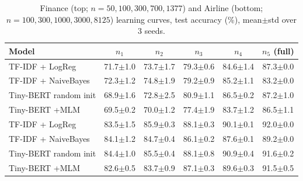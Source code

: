 \begin{table}[t]
\centering\small\setlength{\tabcolsep}{3pt}
\caption{Finance (top; $n=50,100,300,700,1377$) and Airline (bottom; $n=100,300,1000,3000,8125$) learning curves, test accuracy (\%), mean$\pm$std over 3 seeds.}\label{tab:fin_air}
\begin{tabular}{lccccc}
\toprule
Model & $n_1$ & $n_2$ & $n_3$ & $n_4$ & $n_5$ (full) \\
\midrule
TF-IDF + LogReg & 71.7$\pm$1.0 & 73.7$\pm$1.7 & 79.3$\pm$0.6 & 84.6$\pm$1.4 & 87.3$\pm$0.0 \\
TF-IDF + NaiveBayes & 72.3$\pm$1.2 & 74.8$\pm$1.9 & 79.2$\pm$0.9 & 85.2$\pm$1.1 & 83.2$\pm$0.0 \\
Tiny-BERT random init & 68.9$\pm$1.6 & 72.8$\pm$2.5 & 80.9$\pm$1.1 & 86.5$\pm$0.2 & 87.2$\pm$1.0 \\
Tiny-BERT +MLM & 69.5$\pm$0.2 & 70.0$\pm$1.2 & 77.4$\pm$1.9 & 83.7$\pm$1.2 & 86.5$\pm$1.1 \\
\midrule
TF-IDF + LogReg & 83.5$\pm$1.5 & 85.9$\pm$0.3 & 88.1$\pm$0.3 & 90.1$\pm$0.1 & 92.0$\pm$0.0 \\
TF-IDF + NaiveBayes & 84.1$\pm$1.2 & 84.7$\pm$0.4 & 86.1$\pm$0.2 & 87.6$\pm$0.1 & 89.2$\pm$0.0 \\
Tiny-BERT random init & 84.4$\pm$1.0 & 85.5$\pm$0.4 & 88.1$\pm$0.8 & 90.9$\pm$0.4 & 91.6$\pm$0.2 \\
Tiny-BERT +MLM & 82.6$\pm$0.5 & 83.7$\pm$0.9 & 87.1$\pm$0.3 & 89.6$\pm$0.3 & 91.5$\pm$0.5 \\
\midrule
\bottomrule
\end{tabular}
\end{table}